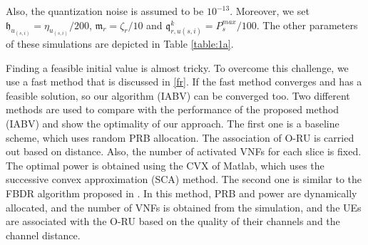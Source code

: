 \documentclass[lettersize,journal]{IEEEtran}
\begin{document}
Also, the quantization noise is assumed to be $10^{-13}$.
Moreover, we set $\mathfrak{h}_{u_{(s,i)}} = \eta_{u_{(s,i)}}/200$, $\mathfrak{m}_{r} = \zeta_r/10$
and $\mathfrak{q}^k_{r,u(s,i)} = P_{s}^{max}/100$. The other parameters of these simulations are depicted in Table \ref{table:1a}.
\begin{table}[H]
 \caption {Simulation Parameters} \label{table:1a}
 \begin{center}
 \end{center}
 \end{table} 
Finding a feasible initial value is almost tricky. To overcome this challenge, we use a fast method that is discussed in \ref{fr}. If the fast method converges and has a feasible solution, so our algorithm (IABV) can be converged too.
Two different methods are used to compare with the performance of the proposed method (IABV) and show the optimality of our approach.
 The first one is a baseline scheme, which uses random PRB allocation. The association of O-RU is carried out based on distance. Also, the number of activated VNFs for each slice is fixed. The optimal power is obtained using the CVX of Matlab, which uses the successive convex approximation (SCA) method. The second one is similar to the FBDR algorithm proposed in \cite{lee2018dynamic}. In this method, PRB and power are dynamically allocated, and the number of VNFs is obtained from the simulation, and the UEs are associated with the O-RU based on the quality of their channels and the channel distance.
\vspace*{-2em}
\end{document}
